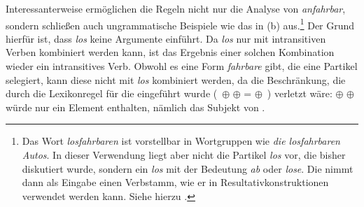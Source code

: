 Interessanterweise ermöglichen die Regeln nicht nur die Analyse von \emph{anfahrbar}, sondern
schließen auch ungrammatische Beispiele wie das in (b) aus.\footnote{
  Das Wort \emph{losfahrbaren} ist vorstellbar in Wortgruppen wie \emph{die losfahrbaren Autos}.
  In dieser Verwendung liegt aber nicht die Partikel \emph{los} vor, die bisher diskutiert
  wurde, sondern ein \emph{los} mit der Bedeutung \emph{ab} oder \emph{lose}. Die \bard
  nimmt dann als Eingabe einen Verbstamm, wie er in
  Resultativkonstruktionen verwendet werden 
  kann. Siehe hierzu .%
}
\eal
{}
\zl
Der Grund hierfür ist, dass \emph{los} keine Argumente einführt. Da \emph{los} nur mit intransitiven
Verben kombiniert werden kann, ist das Ergebnis einer solchen Kombination wieder ein intransitives Verb.
Obwohl es eine Form \emph{fahrbare} gibt, die eine Partikel selegiert, kann diese nicht mit \emph{los}
kombiniert werden, da die Beschränkung, die durch die Lexikonregel für die \bard eingeführt wurde
(\, $\oplus$  $\oplus$  =  $\oplus$ \,) 
verletzt wäre:  $\oplus$  $\oplus$  würde nur ein Element enthalten,
nämlich das Subjekt von .


